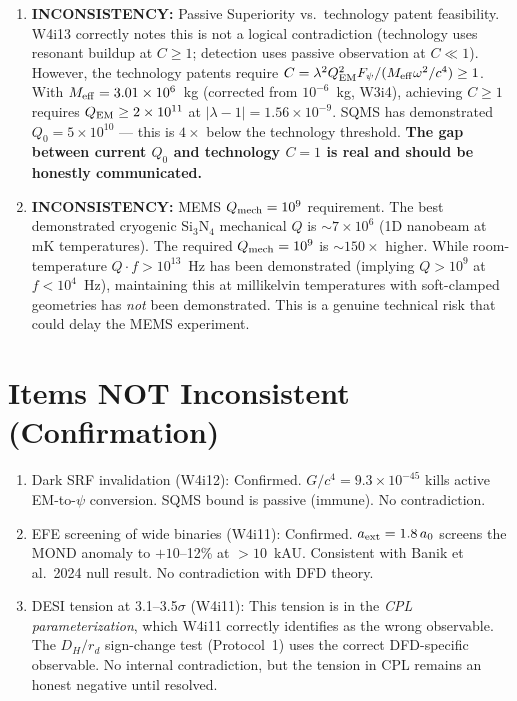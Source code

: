 \documentclass[11pt]{article}
\newcommand{\ee}[1]{\times 10^{#1}}
\newcommand{\lbone}{|\lambda - 1|}
\newcommand{\inconsistency}[1]{\textcolor{red!70!black}{\textbf{INCONSISTENCY:} #1}}
\begin{document}
\begin{enumerate}
\item \inconsistency{Passive Superiority vs.\ technology patent feasibility.}
W4i13 correctly notes this is not a logical contradiction (technology
uses resonant buildup at $C \geq 1$; detection uses passive observation
at $C \ll 1$). However, the technology patents require
$C = \lambda^2 Q_{\rm EM}^2 F_\psi / (M_{\rm eff} \omega^2 / c^4) \geq 1$.
With $M_{\rm eff} = 3.01\ee{6}$~kg (corrected from $10^{-6}$~kg,
W3i4), achieving $C \geq 1$ requires $Q_{\rm EM} \geq 2\ee{11}$ at
$\lbone = 1.56\ee{-9}$. SQMS has demonstrated $Q_0 = 5\ee{10}$ ---
this is $4\times$ below the technology threshold. \textbf{The gap
between current $Q_0$ and technology $C = 1$ is real and should be
honestly communicated.}

\item \inconsistency{MEMS $Q_{\rm mech} = 10^9$ requirement.}
The best demonstrated cryogenic Si$_3$N$_4$ mechanical $Q$ is
$\sim 7\ee{6}$ (1D nanobeam at mK temperatures). The required
$Q_{\rm mech} = 10^9$ is $\sim 150\times$ higher. While room-temperature
$Q \cdot f > 10^{13}$~Hz has been demonstrated (implying $Q > 10^9$
at $f < 10^4$~Hz), maintaining this at millikelvin temperatures
with soft-clamped geometries has \emph{not} been demonstrated.
This is a genuine technical risk that could delay the MEMS experiment.
\end{enumerate}

\section{Items NOT Inconsistent (Confirmation)}

\begin{enumerate}
\item Dark SRF invalidation (W4i12): Confirmed. $G/c^4 = 9.3\ee{-45}$
  kills active EM-to-$\psi$ conversion. SQMS bound is passive (immune).
  No contradiction.

\item EFE screening of wide binaries (W4i11): Confirmed. $a_{\rm ext}
  = 1.8\,a_0$ screens the MOND anomaly to $+10$--12\% at $>10$~kAU.
  Consistent with Banik et al.\ 2024 null result. No contradiction
  with DFD theory.

\item DESI tension at 3.1--3.5$\sigma$ (W4i11): This tension is in
  the \emph{CPL parameterization}, which W4i11 correctly identifies as
  the wrong observable. The $D_H/r_d$ sign-change test (Protocol~1)
  uses the correct DFD-specific observable. No internal contradiction,
  but the tension in CPL remains an honest negative until resolved.
\end{enumerate}
\end{document}

